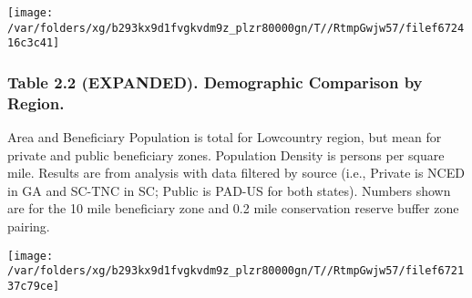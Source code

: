 \documentclass[landscape]{article}
\begin{document}
\texttt{[image: /var/folders/xg/b293kx9d1fvgkvdm9z\_plzr80000gn/T//RtmpGwjw57/filef672416c3c41]}
\pagebreak

\hypertarget{table-2.2-expanded.-demographic-comparison-by-region.}{%
\subsubsection{Table 2.2 (EXPANDED). Demographic Comparison by
Region.}\label{table-2.2-expanded.-demographic-comparison-by-region.}}

Area and Beneficiary Population is total for Lowcountry region, but mean
for private and public beneficiary zones. Population Density is persons
per square mile. Results are from analysis with data filtered by source
(i.e., Private is NCED in GA and SC-TNC in SC; Public is PAD-US for both
states). Numbers shown are for the 10 mile beneficiary zone and 0.2 mile
conservation reserve buffer zone pairing.

\texttt{[image: /var/folders/xg/b293kx9d1fvgkvdm9z\_plzr80000gn/T//RtmpGwjw57/filef672137c79ce]}
\end{document}
